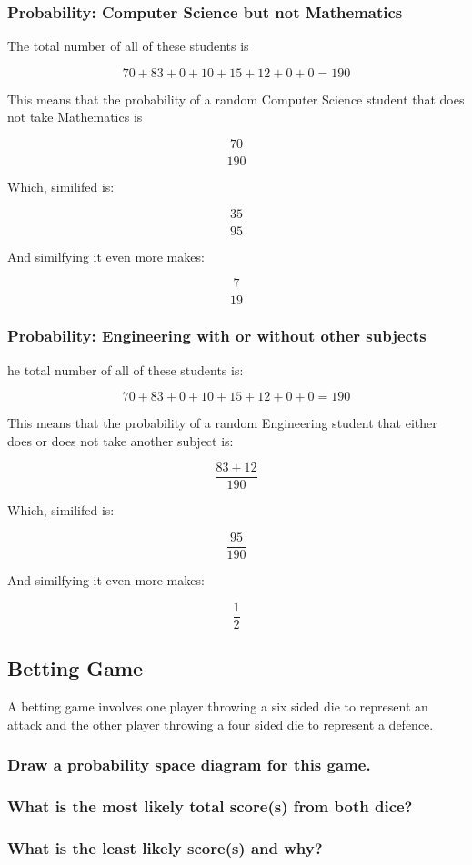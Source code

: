 \documentclass[a4paper,12pt]{article}
\begin{document}
\subsubsection{Probability: Computer Science but not Mathematics}

The total number of all of these students is

$$70 + 83 + 0 + 10 + 15 + 12 + 0 + 0 = 190$$

This means that the probability of a random Computer Science student that does not take Mathematics is

$$\frac{70}{190}$$

Which, similifed is:

$$\frac{35}{95}$$

And similfying it even more makes:

$$\frac{7}{19}$$

\subsubsection{Probability: Engineering with or without other subjects}

he total number of all of these students is:

$$70 + 83 + 0 + 10 + 15 + 12 + 0 + 0 = 190$$

This means that the probability of a random Engineering student that either does or does not take another subject is:

$$\frac{83 + 12}{190}$$

Which, similifed is:

$$\frac{95}{190}$$

And similfying it even more makes:

$$\frac{1}{2}$$

\newpage

\subsection{Betting Game}
A betting game involves one player throwing a six sided die to represent an attack and the other player throwing a four sided die to represent a defence.
\subsubsection{Draw a probability space diagram for this game.}
\subsubsection{What is the most likely total score(s) from both dice?}
\subsubsection{What is the least likely score(s) and why?}

\begin{tabular}{c}
\end{tabular}
\end{document}
